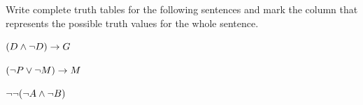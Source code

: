 \begin{practiceproblems}
\begin{problemslist}
	\vspace{1em}
	
\end{problemslist}

\problempart
Write complete truth tables for the following sentences and mark the column that represents the possible truth values for the whole sentence.

\begin{problemslist}
	
	\item	$(D \mathbin{\wedge} \neg D) \rightarrow G $
%	
%	
	\vspace{1em}
	
	
	\item	$(\neg P \vee \neg M) \rightarrow M $
	
	\vspace{1em}
	
	
	
	\item	$\neg \neg (\neg A \mathbin{\wedge} \neg B)  $
%	
	\vspace{1em}
	

\end{problemslist}
\end{practiceproblems}
